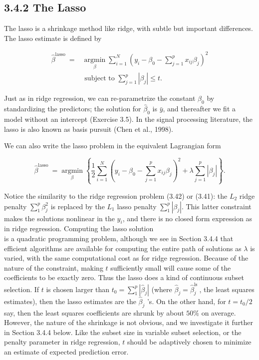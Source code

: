 \documentclass[10pt]{article}
\begin{document}
\subsection*{3.4.2 The Lasso}
The lasso is a shrinkage method like ridge, with subtle but important differences. The lasso estimate is defined by


\begin{align*}
\hat{\beta}^{\text {lasso }}= & \underset{\beta}{\operatorname{argmin}} \sum_{i=1}^{N}\left(y_{i}-\beta_{0}-\sum_{j=1}^{p} x_{i j} \beta_{j}\right)^{2} \\
& \text { subject to } \sum_{j=1}^{p}\left|\beta_{j}\right| \leq t . \tag{3.51}
\end{align*}


Just as in ridge regression, we can re-parametrize the constant $\beta_{0}$ by standardizing the predictors; the solution for $\hat{\beta}_{0}$ is $\bar{y}$, and thereafter we fit a model without an intercept (Exercise 3.5). In the signal processing literature, the lasso is also known as basis pursuit (Chen et al., 1998).

We can also write the lasso problem in the equivalent Lagrangian form


\begin{equation*}
\hat{\beta}^{\text {lasso }}=\underset{\beta}{\operatorname{argmin}}\left\{\frac{1}{2} \sum_{i=1}^{N}\left(y_{i}-\beta_{0}-\sum_{j=1}^{p} x_{i j} \beta_{j}\right)^{2}+\lambda \sum_{j=1}^{p}\left|\beta_{j}\right|\right\} . \tag{3.52}
\end{equation*}


Notice the similarity to the ridge regression problem (3.42) or (3.41): the $L_{2}$ ridge penalty $\sum_{1}^{p} \beta_{j}^{2}$ is replaced by the $L_{1}$ lasso penalty $\sum_{1}^{p}\left|\beta_{j}\right|$. This latter constraint makes the solutions nonlinear in the $y_{i}$, and there is no closed form expression as in ridge regression. Computing the lasso solution\\
is a quadratic programming problem, although we see in Section 3.4.4 that efficient algorithms are available for computing the entire path of solutions as $\lambda$ is varied, with the same computational cost as for ridge regression. Because of the nature of the constraint, making $t$ sufficiently small will cause some of the coefficients to be exactly zero. Thus the lasso does a kind of continuous subset selection. If $t$ is chosen larger than $t_{0}=\sum_{1}^{p}\left|\hat{\beta}_{j}\right|$ (where $\hat{\beta}_{j}=\hat{\beta}_{j}^{\text {ls }}$, the least squares estimates), then the lasso estimates are the $\hat{\beta}_{j}$ 's. On the other hand, for $t=t_{0} / 2$ say, then the least squares coefficients are shrunk by about $50 \%$ on average. However, the nature of the shrinkage is not obvious, and we investigate it further in Section 3.4.4 below. Like the subset size in variable subset selection, or the penalty parameter in ridge regression, $t$ should be adaptively chosen to minimize an estimate of expected prediction error.
\end{document}

